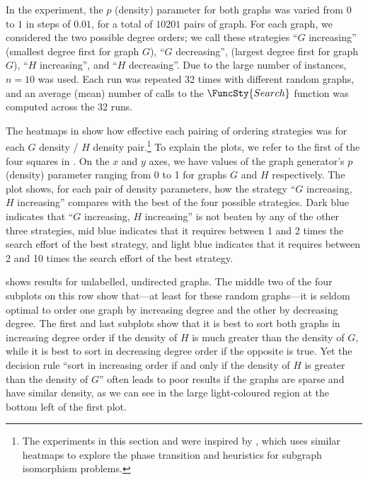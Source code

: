 In the experiment, the $p$ (density) parameter for both graphs was varied from
$0$ to $1$ in steps of $0.01$, for a total of $10201$ pairs of graph.  For each
graph, we considered the two possible degree orders; we call these strategies
``$G$ increasing'' (smallest degree first for graph $G$), ``$G$ decreasing'',
(largest degree first for graph $G$),
``$H$ increasing'', and ``$H$ decreasing''.  Due to the large number of
instances, $n=10$ was used.  Each run was repeated 32 times with different
random graphs, and an average (mean) number of calls to the $\FuncSty{Search}$
function was computed across the 32 runs.

The heatmaps in  show how effective each pairing of
ordering strategies was for each $G$ density / $H$ density pair.\footnote{The
experiments in this section and 
were inspired by \citet{DBLP:journals/jair/McCreeshPST18}, which uses similar
heatmaps to explore the phase transition and heuristics for subgraph
isomorphism problems.}
To explain
the plots, we refer to the first of the four squares in
.  On the $x$ and $y$ axes, we have
values of the graph generator's $p$ (density) parameter ranging from 0 to 1 for
graphs $G$ and $H$ respectively.  The plot shows, for each pair of density
parameters, how the strategy ``$G$ increasing, $H$ increasing'' compares with
the best of the four possible strategies.  Dark blue indicates that ``$G$
increasing, $H$ increasing'' is not beaten by any of the other three
strategies, mid blue indicates that it requires between 1 and 2 times the
search effort of the best strategy, and light blue indicates that it requires
between 2 and 10 times the search effort of the best strategy.

 shows results for unlabelled, undirected graphs.
The middle two of the four subplots on this row show that---at least for these random graphs---it
is seldom optimal to order one graph by increasing degree and the other
by decreasing degree.
The first and last subplots show that it is best to sort both graphs in increasing degree
order if the density of $H$ is much greater than the density of $G$, while
it is best to sort in decreasing degree order if the opposite is true.  Yet the
decision rule ``sort in increasing order if and only if the density of $H$ is
greater than the density of $G$'' often leads to poor results if the graphs are
sparse and have similar density, as we can see in the large light-coloured
region at the bottom left of the first plot.

